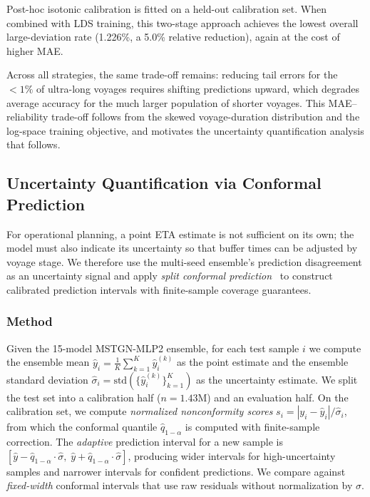 \documentclass[conference]{IEEEtran}
\begin{document}
Post-hoc isotonic calibration is fitted on a held-out calibration set. When combined with LDS training, this two-stage approach achieves the lowest overall large-deviation rate (1.226\%, a 5.0\% relative reduction), again at the cost of higher MAE.

Across all strategies, the same trade-off remains: reducing tail errors for the $< 1\%$ of ultra-long voyages requires shifting predictions upward, which degrades average accuracy for the much larger population of shorter voyages. This MAE--reliability trade-off follows from the skewed voyage-duration distribution and the log-space training objective, and motivates the uncertainty quantification analysis that follows.

\subsection{Uncertainty Quantification via Conformal Prediction}
\label{sec:uq}

For operational planning, a point ETA estimate is not sufficient on its own; the model must also indicate its uncertainty so that buffer times can be adjusted by voyage stage. We therefore use the multi-seed ensemble's prediction disagreement as an uncertainty signal and apply \textit{split conformal prediction}~\cite{vovk2005conformal,romano2019cqr} to construct calibrated prediction intervals with finite-sample coverage guarantees.

\subsubsection{Method}
Given the 15-model MSTGN-MLP2 ensemble, for each test sample $i$ we compute the ensemble mean $\hat{y}_i = \frac{1}{K}\sum_{k=1}^{K}\hat{y}_i^{(k)}$ as the point estimate and the ensemble standard deviation $\hat{\sigma}_i = \text{std}(\{\hat{y}_i^{(k)}\}_{k=1}^{K})$ as the uncertainty estimate.
We split the test set into a calibration half ($n=1.43$M) and an evaluation half.
On the calibration set, we compute \textit{normalized nonconformity scores} $s_i = |y_i - \hat{y}_i| / \hat{\sigma}_i$, from which the conformal quantile $\hat{q}_{1{-}\alpha}$ is computed with finite-sample correction.
The \textit{adaptive} prediction interval for a new sample is $[\hat{y} - \hat{q}_{1{-}\alpha} \cdot \hat{\sigma},\; \hat{y} + \hat{q}_{1{-}\alpha} \cdot \hat{\sigma}]$, producing wider intervals for high-uncertainty samples and narrower intervals for confident predictions.
We compare against \textit{fixed-width} conformal intervals that use raw residuals without normalization by $\hat{\sigma}$.
\end{document}
